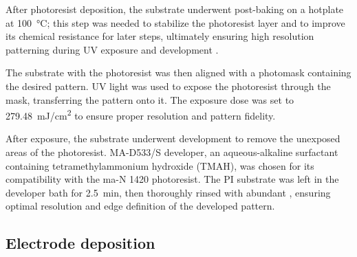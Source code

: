 After photoresist deposition, the substrate underwent post-baking on a hotplate at \SI{100}{\celsius}; this step was needed to stabilize the photoresist layer and to improve its chemical resistance for later steps, ultimately ensuring high resolution patterning during UV exposure and development \citep{miyajimaHighaspectratio1995}.

The substrate with the photoresist was then aligned with a photomask containing the desired pattern. UV light was used to expose the photoresist through the mask, transferring the pattern onto it. The exposure dose was set to \SI{279.48}{\mJ/\cm\squared} to ensure proper resolution and pattern fidelity.

After exposure, the substrate underwent development to remove the unexposed areas of the photoresist. MA-D533/S developer, an aqueous-alkaline surfactant containing tetramethylammonium hydroxide (TMAH), was chosen for its compatibility with the ma-N 1420 photoresist. The PI substrate was left in the developer bath for \SI{2.5}{\minute}, then thoroughly rinsed with abundant , ensuring optimal resolution and edge definition of the developed pattern.

\subsection{Electrode deposition}
\label{sec:eavporation}

